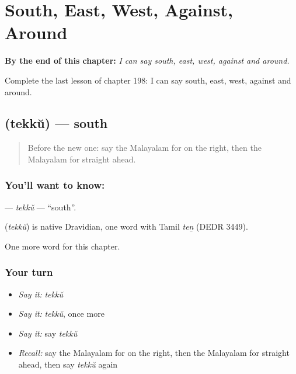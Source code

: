
\chapter{South, East, West, Against, Around}
\label{ch:ml-south-east-west-against-around}

\begin{chapteropening}
\textbf{By the end of this chapter:} \emph{I can say south, east, west, against and around.}

Complete the last lesson of chapter 198: I can say south, east, west, against and around.
\end{chapteropening}

\section[\texorpdfstring{\ml{തെക്ക്} (tekkŭ)}{തെക്ക് (tekkŭ)}]{ (tekkŭ) — south}

\label{lesson:ML-C198-tekku}



\begin{quote}
Before the new one: say the Malayalam for on the right, then the Malayalam for straight ahead.
\end{quote}

\subsection*{You'll want to know: }
\textbf{} — \emph{tekkŭ} — \textquotedblleft{}south\textquotedblright{}.

\begin{cousinweb}
\textbf{} (\emph{tekkŭ}) is native Dravidian, one word with Tamil \emph{teṉ} (DEDR 3449).
\end{cousinweb}

\begin{grammarlens}[title={What you've built}]
One more word for this chapter.
\end{grammarlens}

\subsection*{Your turn}
\begin{itemize}
\raggedright
  \item \emph{Say it:} \emph{tekkŭ}
  \item \emph{Say it:} \emph{tekkŭ}, once more
  \item \emph{Say it:} say \emph{tekkŭ}
  \item \emph{Recall:} say the Malayalam for on the right, then the Malayalam for straight ahead, then say \emph{tekkŭ} again
\end{itemize}

